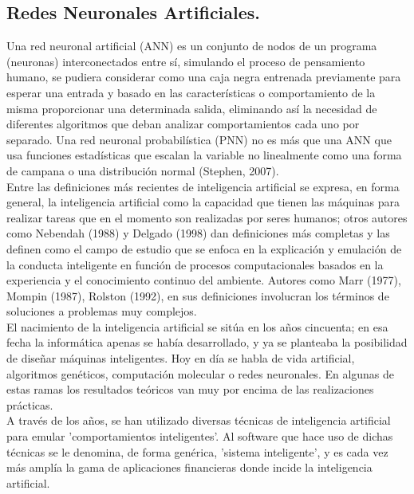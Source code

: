 \subsection{Redes Neuronales Artificiales.}

Una red neuronal artificial (ANN) es un conjunto de nodos de un programa (neuronas) interconectados entre sí, simulando el proceso de pensamiento humano, se pudiera considerar como una caja negra entrenada previamente para esperar una entrada y basado en las características o comportamiento de la misma proporcionar una determinada salida, eliminando así la necesidad de diferentes algoritmos que deban analizar comportamientos cada uno por separado. Una red neuronal probabilística (PNN) no es más que una ANN que usa funciones estadísticas que escalan la variable no linealmente como una forma de campana o una distribución normal (Stephen, 2007).\\

Entre las definiciones más recientes de inteligencia artificial se expresa, en forma general, la inteligencia artificial como la capacidad que tienen las máquinas para realizar tareas que en el momento son realizadas por seres humanos; otros autores como Nebendah (1988) y Delgado (1998) dan definiciones más completas y las definen como el campo de estudio que se enfoca en la explicación y emulación de la conducta inteligente en función de procesos computacionales basados en la experiencia y el conocimiento continuo del ambiente. Autores como Marr (1977), Mompin (1987), Rolston (1992), en sus definiciones involucran los términos de soluciones a problemas muy complejos.\\

El nacimiento de la inteligencia artificial se sitúa en los años cincuenta; en esa fecha la informática apenas se había desarrollado, y ya se planteaba la posibilidad de diseñar máquinas inteligentes. Hoy en día se habla de vida artificial, algoritmos genéticos, computación molecular o redes neuronales. En algunas de estas ramas los resultados teóricos van muy por encima de las realizaciones prácticas.\\

A través de los años, se han utilizado diversas técnicas de inteligencia artificial para emular 'comportamientos inteligentes'. Al software que hace uso de dichas técnicas se le denomina, de forma genérica, 'sistema inteligente', y es cada vez más amplía la gama de aplicaciones financieras donde incide la inteligencia artificial.\\

